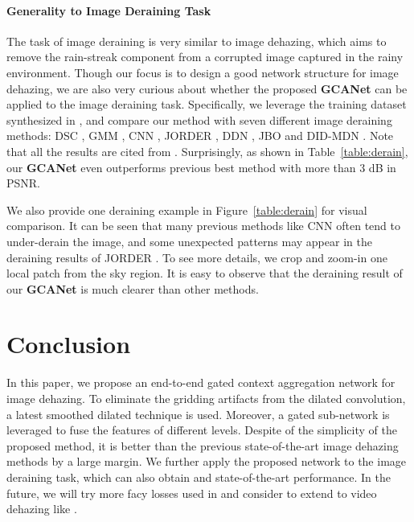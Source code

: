 \documentclass[10pt,twocolumn,letterpaper]{article}
\newcommand{\Tref}[1]{Table~\ref{#1}}
\newcommand{\Fref}[1]{Figure~\ref{#1}}
\begin{document}
\paragraph{Generality to Image Deraining Task} The task of image deraining is very similar to image dehazing, which aims to remove the rain-streak component from a corrupted image captured in the rainy environment. Though our focus is to design a good network structure for image dehazing, we are also very curious about whether the proposed \textbf{GCANet} can be applied to the image deraining task. Specifically, we leverage the training dataset synthesized in \cite{zhang2018density}, and compare our method with seven different image deraining methods: DSC \cite{luo2015removing}, GMM \cite{li2016rain}, CNN \cite{fu2017clearing}, JORDER \cite{yang2017deep}, DDN \cite{fu2017removing}, JBO \cite{zhu2017joint} and DID-MDN \cite{zhang2018density}. Note that all the results are cited from \cite{zhang2018density}. Surprisingly, as shown in \Tref{table:derain}, our \textbf{GCANet} even outperforms previous best method \cite{zhang2018density} with more than 3 dB in PSNR.

We also provide one deraining example in \Fref{table:derain} for visual comparison.  It can be seen that many previous methods like CNN \cite{fu2017clearing,fu2017removing} often tend to under-derain the image, and some unexpected patterns may appear in the deraining results of JORDER \cite{yang2017deep}. To see more details, we crop and zoom-in one local patch from the sky region. It is easy to observe that the deraining result of our \textbf{GCANet} is much clearer than other methods.
\section{Conclusion}
In this paper, we propose an end-to-end gated context aggregation network for image dehazing. To eliminate the gridding artifacts from the dilated convolution, a latest smoothed dilated technique is used. Moreover, a gated sub-network is leveraged to fuse the features of different levels. Despite of the simplicity of the proposed method, it is better than the previous state-of-the-art image dehazing methods by a large margin. We further apply the proposed network to the image deraining task, which can also obtain and state-of-the-art performance. In the future, we will try more facy losses used in \cite{chen2017stylebank,he2018deep} and consider to extend to video dehazing like \cite{chen2017coherent}. 
{\small


}
\end{document}
